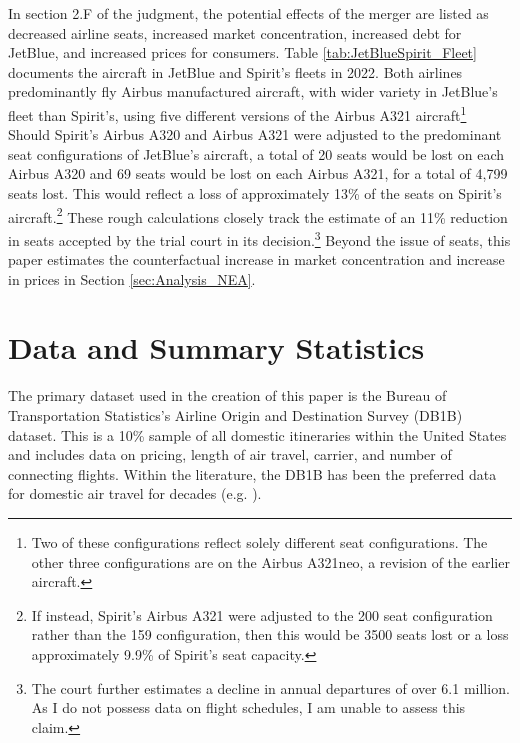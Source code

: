 \documentclass{article}
\begin{document}
	In section 2.F of the judgment, the potential effects of the merger are listed as decreased airline seats, increased market concentration, increased debt for JetBlue, and increased prices for consumers. Table \ref{tab:JetBlueSpirit_Fleet} documents the aircraft in JetBlue and Spirit's fleets in 2022. Both airlines predominantly fly Airbus manufactured aircraft, with wider variety in JetBlue's fleet than Spirit's, using five different versions of the Airbus A321 aircraft\footnote{Two of these configurations reflect solely different seat configurations. The other three configurations are on the Airbus A321neo, a revision of the earlier aircraft.} Should Spirit's Airbus A320 and Airbus A321 were adjusted to the predominant seat configurations of JetBlue's aircraft, a total of 20 seats would be lost on each Airbus A320 and 69 seats would be lost on each Airbus A321, for a total of 4,799 seats lost. This would reflect a loss of approximately 13\% of the seats on Spirit's aircraft.\footnote{If instead, Spirit's Airbus A321 were adjusted to the 200 seat configuration rather than the 159 configuration, then this would be 3500 seats lost or a loss approximately 9.9\% of Spirit's seat capacity.} These rough calculations closely track the estimate of an 11\% reduction in seats accepted by the trial court in its decision.\footnote{The court further estimates a decline in annual departures of over 6.1 million. As I do not possess data on flight schedules, I am unable to assess this claim.} Beyond the issue of seats, this paper estimates the counterfactual increase in market concentration and increase in prices in Section \ref{sec:Analysis_NEA}. 

	\section{Data and Summary Statistics}
	\label{sec:Data}
	The primary dataset used in the creation of this paper is the Bureau of Transportation Statistics's Airline Origin and Destination Survey (DB1B) dataset. This is a 10\% sample of all domestic itineraries within the United States and includes data on pricing, length of air travel, carrier, and number of connecting flights. Within the literature, the DB1B has been the preferred data for domestic air travel for decades (e.g.  \citet{ciliberto_market_2021, berry_tracing_2010, goolsbee_how_2008, peters_evaluating_2006}). 
	
\end{document}
